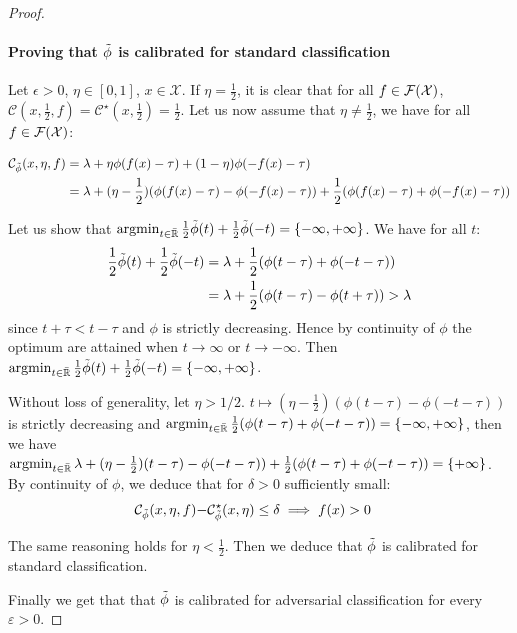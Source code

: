 \begin{proof}
    \paragraph{Proving that $\Tilde{\phi}$ is calibrated for standard classification} Let $\epsilon>0$, $\eta\in[0,1]$, $x\in\mathcal{X}$. If $\eta=\frac12$, it is clear that for all $f\in\mathcal{F}(\mathcal{X})$, $\mathcal{C}(x,\frac12,f)= \mathcal{C}^\star(x,\frac12)=\frac12$. Let us now assume that $\eta\neq\frac12$, we have for all $f\in\mathcal{F}(\mathcal{X})$:
    
    \begin{align*}
         \mathcal{C}_{\Tilde{\phi}}(x,\eta,f) &= \lambda + \eta\phi(f(x)-\tau) + (1-\eta)\phi(-f(x)-\tau)\\
         &= \lambda + (\eta-\frac12)\left(\phi(f(x)-\tau)-\phi(-f(x)-\tau)\right)+\frac12 \left(\phi(f(x)-\tau)+\phi(-f(x)-\tau)\right)
    \end{align*}
    
    
    Let us  show that $\operatorname*{argmin}_{t\in\bar{\mathbb{R}}}\frac12\Tilde{\phi}(t)+\frac12 \Tilde{\phi}(-t) = \{-\infty,+\infty\}$. We have for all $t$:
    \begin{align*}
        \frac12\Tilde{\phi}(t)+\frac12\Tilde{\phi}(-t) &= \lambda +\frac12 \left(\phi(t-\tau)+\phi(-t-\tau)\right)\\
        & = \lambda +\frac12 \left(\phi(t-\tau)-\phi(t+\tau)\right)>\lambda
    \end{align*}
    since $t+\tau< t-\tau$ and $\phi$ is strictly decreasing. Hence by continuity of $\phi$ the optimum are attained when $t\to\infty$ or $t\to-\infty$. Then $\operatorname*{argmin}_{t\in\bar{\mathbb{R}}}\frac12\Tilde{\phi}(t)+\frac12 \Tilde{\phi}(-t) = \{-\infty,+\infty\}$.
    
    Without loss of generality, let $\eta>1/2$. $t\mapsto  (\eta-\frac12)\left(\phi(t-\tau)-\phi(-t-\tau)\right)$ is strictly decreasing and $\argminB_{t\in\bar{\RR}}\frac12 \left(\phi(t-\tau)+\phi(-t-\tau)\right) = \{-\infty,+\infty\}$, then we have $ \argminB_{t\in\bar{\RR}} \lambda + (\eta-\frac12)\left(t-\tau)-\phi(-t-\tau)\right)+\frac12 \left(\phi(t-\tau)+\phi(-t-\tau)\right) = \{+\infty\}$. By continuity of $\phi$, we deduce that for $\delta>0$ sufficiently small:
    \begin{align*}
        \mathcal{C}_{\Tilde{\phi}}(x,\eta,f)-&\mathcal{C}^\star_{\Tilde{\phi}}(x,\eta)\leq\delta\implies f(x)>0
    \end{align*}
    
    The same reasoning holds for $\eta<\frac12$. Then we deduce that $\Tilde{\phi}$ is calibrated for standard classification.
    
    \medskip
    
    Finally we get that  that $\Tilde{\phi}$ is calibrated for adversarial classification for every $\varepsilon>0$.
\end{proof}
    
